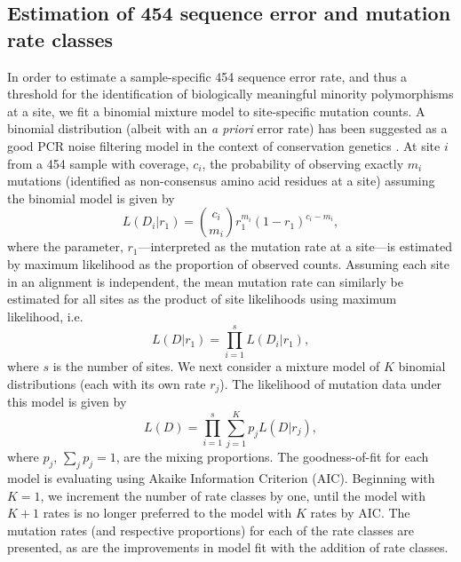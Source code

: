 \documentclass[10pt]{article}
\begin{document}
\subsection*{Estimation of 454 sequence error and mutation rate classes}
In order to estimate a sample-specific 454 sequence error rate,
and thus a threshold for the identification of biologically meaningful minority polymorphisms at a site,
we fit a binomial mixture model to site-specific mutation counts.
A binomial distribution (albeit with an \textit{a priori} error rate)
has been suggested as a good PCR noise filtering model in the context of conservation genetics \cite{Cummings2010}.
At site $i$ from a 454 sample with coverage, $c_{i}$, the probability of observing exactly $m_{i}$ mutations
(identified as non-consensus amino acid residues at a site) assuming the binomial model is given by
\begin{equation}
L(D_{i}|r_{1}) = \binom{c_{i}}{m_{i}}r_{1}^{m_{i}}(1-r_{1})^{c_{i}-m_{i}},
\end{equation}
where the parameter, $r_{1}$---interpreted as the mutation rate at a site---is estimated by maximum likelihood as the proportion of observed counts.
Assuming each site in an alignment is independent,
the mean mutation rate can similarly be estimated for all sites as the product of site likelihoods using maximum likelihood, i.e.
\begin{equation}
L(D|r_{1}) = \prod_{i=1}^{s}  L(D_{i}|r_{1}),
\end{equation}
where $s$ is the number of sites.
We next consider a mixture model of $K$ binomial distributions (each with its own rate $r_{j}$).
The likelihood of mutation data under this model is given by
\begin{equation}
L(D) = \prod_{i=1}^{s}  \sum_{j=1}^{K} p_{j} L(D|r_{j}),
\end{equation}
where $p_{j}$, $\sum_{j} p_{j} = 1$, are the mixing proportions.
The goodness-of-fit for each model is evaluating using Akaike Information Criterion (AIC).
Beginning with $K=1$, we increment the number of rate classes by one,
until the model with $K+1$ rates is no longer preferred to the model with $K$ rates by AIC.
The mutation rates (and respective proportions) for each of the rate classes are presented,
as are the improvements in model fit with the addition of rate classes.
\end{document}
